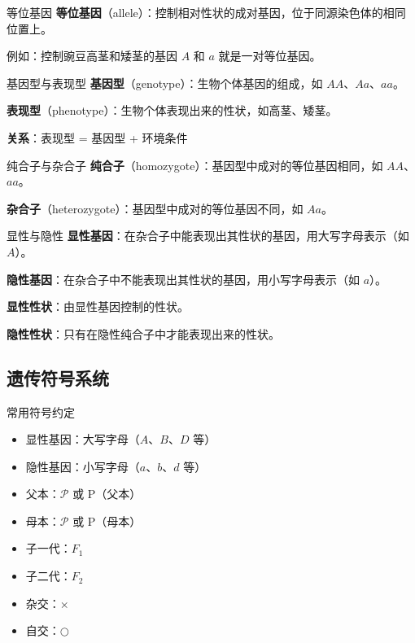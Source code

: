 \documentclass[a4paper,11pt]{ctexart}
\begin{document}
\begin{definitionbox}{等位基因}
\textbf{等位基因}（allele）：控制相对性状的成对基因，位于同源染色体的相同位置上。

例如：控制豌豆高茎和矮茎的基因 $A$ 和 $a$ 就是一对等位基因。
\end{definitionbox}

\begin{definitionbox}{基因型与表现型}
\textbf{基因型}（genotype）：生物个体基因的组成，如 $AA$、$Aa$、$aa$。

\textbf{表现型}（phenotype）：生物个体表现出来的性状，如高茎、矮茎。

\textbf{关系}：表现型 = 基因型 + 环境条件
\end{definitionbox}

\begin{definitionbox}{纯合子与杂合子}
\textbf{纯合子}（homozygote）：基因型中成对的等位基因相同，如 $AA$、$aa$。

\textbf{杂合子}（heterozygote）：基因型中成对的等位基因不同，如 $Aa$。
\end{definitionbox}

\begin{definitionbox}{显性与隐性}
\textbf{显性基因}：在杂合子中能表现出其性状的基因，用大写字母表示（如 $A$）。

\textbf{隐性基因}：在杂合子中不能表现出其性状的基因，用小写字母表示（如 $a$）。

\textbf{显性性状}：由显性基因控制的性状。

\textbf{隐性性状}：只有在隐性纯合子中才能表现出来的性状。
\end{definitionbox}

\subsection{遗传符号系统}

\begin{lemmabox}{常用符号约定}
\begin{itemize}[leftmargin=2em]
    \item 显性基因：大写字母（$A$、$B$、$D$ 等）
    \item 隐性基因：小写字母（$a$、$b$、$d$ 等）
    \item 父本：$\mathcal{P}$ 或 P（父本）
    \item 母本：$\mathcal{P}$ 或 P（母本）
    \item 子一代：$F_1$
    \item 子二代：$F_2$
    \item 杂交：$\times$
    \item 自交：$\bigcirc$
\end{itemize}
\end{lemmabox}
\end{document}
